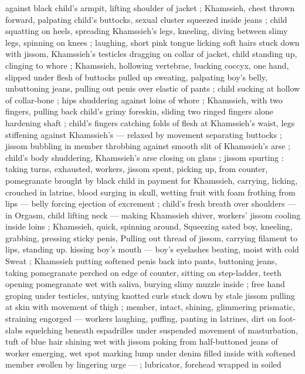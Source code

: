 against black child's armpit, lifting shoulder of jacket ; Khamssieh, 
chest thrown forward, palpating child's buttocks, sexual cluster 
squeezed inside jeans ; child squatting on heels, spreading 
Khamssieh's legs, kneeling, diving between slimy legs, spinning on 
knees ; laughing, short pink tongue licking soft hairs stuck down with 
jissom, Khamssieh's testicles dragging on collar of jacket, child 
standing up, clinging to whore ; Khamssieh, hollowing vertebrae, 
bucking coccyx, one hand, slipped under flesh of buttocks pulled up 
sweating, palpating boy's belly, unbuttoning jeans, pulling out penis 
over elastic of pants ; child sucking at hollow of collar-bone ; hips 
shuddering against loins of whore ; Khamssieh, with two fingers, 
pulling back child's grimy foreskin, sliding two ringed fingers alone 
hardening shaft ; child's fingers catching folds of flesh at 
Khamssieh's waist, legs stiffening against Khamssieh's --- relaxed by 
movement separating buttocks ; jissom bubbling in member 
throbbing against smooth slit of Khamssieh's arse ; child's body 
shuddering, Khamssieh's arse closing on glans ; jissom spurting : 
taking turns, exhausted, workers, jissom spent, picking up, from 
counter, pomegranate brought by black child in payment for 
Khamssieh, carrying, licking, crouched in latrine, blood surging in 
skull, wetting fruit with foam frothing from lips --- belly forcing 
ejection of excrement ; child's fresh breath over shoulders --- in 
Orgasm, child lifting neck --- making Khamssieh shiver, workers' 
jissom cooling inside loins ; Khamssieh, quick, spinning around, 
Squeezing sated boy, kneeling, grabbing, pressing sticky penis, 
Pulling out thread of jissom, carrying filament to lips, standing up. 
kissing boy's mouth --- boy's eyelashes beating, moist with cold 
Sweat ; Khamssieh putting softened penis back into pants, buttoning 
jeans, taking pomegranate perched on edge of counter, sitting on 
step-ladder, teeth opening pomegranate wet with saliva, burying 
slimy muzzle inside ; free hand groping under testicles, untying 
knotted curls stuck down by stale jissom pulling at skin with 
movement of thigh ; member, intact, shining, glimmering prismatic, 
straining engorged --- workers laughing, puffing, panting in latrines, 
dirt on foot-slabs squelching beneath espadrilles under suspended 
movement of masturbation, tuft of blue hair shining wet with jissom 
poking from half-buttoned jeans of worker emerging, wet spot 
marking lump under denim filled inside with softened member 
swollen by lingering urge --- ; lubricator, forehead wrapped in soiled 
